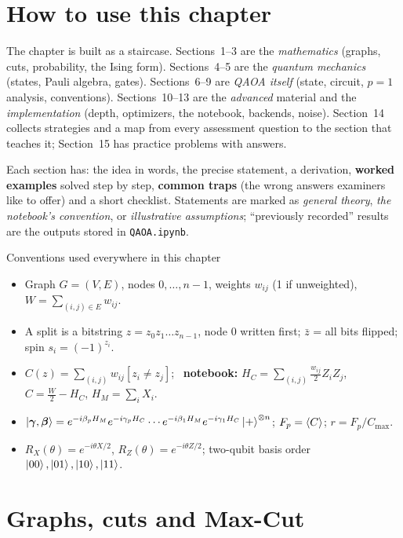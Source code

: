\documentclass[11pt,a4paper,openany]{book}
\newcommand{\bg}{\boldsymbol\gamma}
\newcommand{\bb}{\boldsymbol\beta}
\begin{document}
\section*{How to use this chapter}
The chapter is built as a staircase. Sections~1--3 are the \emph{mathematics} (graphs, cuts, probability, the Ising
form). Sections~4--5 are the \emph{quantum mechanics} (states, Pauli algebra, gates). Sections~6--9 are \emph{QAOA itself}
(state, circuit, $p = 1$ analysis, conventions). Sections~10--13 are the \emph{advanced} material and the
\emph{implementation} (depth, optimizers, the notebook, backends, noise). Section~14 collects strategies and a map from every
assessment question to the section that teaches it; Section~15 has practice problems with answers.

Each section has: the idea in words, the precise statement, a derivation, \textbf{worked examples} solved step by step,
\textbf{common traps} (the wrong answers examiners like to offer) and a short checklist. Statements are marked as
\emph{general theory}, \emph{the notebook's convention}, or \emph{illustrative assumptions}; ``previously recorded'' results are the
outputs stored in \texttt{QAOA.ipynb}.

\begin{defn}{Conventions used everywhere in this chapter}
\begin{itemize}[leftmargin=1.2em, itemsep=1pt]
\item Graph $G = (V, E)$, nodes $0, \dots, n-1$, weights $w_{ij}$ (1 if unweighted), $W = \sum_{(i,j)\in E}w_{ij}$.
\item A split is a bitstring $z = z_0z_1\dots z_{n-1}$, node 0 written first; $\bar z$ = all bits flipped; spin $s_i = (-1)^{z_i}$.
\item $C(z) = \sum_{(i,j)} w_{ij}[z_i\neq z_j]$; \ \textbf{notebook:} $H_C = \sum_{(i,j)}\frac{w_{ij}}{2}Z_iZ_j$, $C = \frac W2 - H_C$, $H_M = \sum_iX_i$.
\item $\ket{\bg,\bb} = e^{-i\beta_pH_M}e^{-i\gamma_pH_C}\cdots e^{-i\beta_1H_M}e^{-i\gamma_1H_C}\ket+^{\otimes n}$; $F_p = \braket{C}$; $r = F_p/C_{\max}$.
\item $R_X(\theta) = e^{-i\theta X/2}$, $R_Z(\theta) = e^{-i\theta Z/2}$; two-qubit basis order $\ket{00}, \ket{01}, \ket{10}, \ket{11}$.
\end{itemize}
\end{defn}

\section{Graphs, cuts and Max-Cut}
\end{document}
